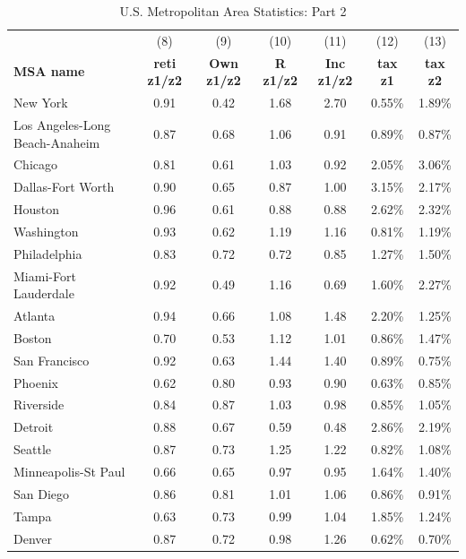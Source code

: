\documentclass[letterpaper,12pt,dvipsnames,usenames]{article}
\theoremstyle{definition}
\begin{document}
\begin{spacing}{1.0}
\begin{small}
\begin{table}
\caption{U.S. Metropolitan Area Statistics: Part 2}\label{table:msas2}
\setlength{\tabcolsep}{5pt}
\renewcommand{\arraystretch}{1.05}
\begin{center}
{\scriptsize
    \begin{tabular}{lcccccc}
    \hline &   (8) & (9) & (10) & (11) & (12) & (13) \\
        \textbf{MSA name} & \textbf{reti z1/z2} & \textbf{Own z1/z2} & \textbf{R z1/z2} & \textbf{Inc z1/z2} & \textbf{tax z1} & \textbf{tax z2}  \\     \hline
New York &    0.91  & 0.42  & 1.68  & 2.70  & 0.55\% & 1.89\%  \\
Los Angeles-Long Beach-Anaheim &0.87  & 0.68  & 1.06  & 0.91  & 0.89\% & 0.87\%  \\
Chicago&0.81  & 0.61  & 1.03  & 0.92  & 2.05\% & 3.06\%  \\
Dallas-Fort Worth & 0.90  & 0.65  & 0.87  & 1.00  & 3.15\% & 2.17\%  \\
Houston & 0.96  & 0.61  & 0.88  & 0.88  & 2.62\% & 2.32\%  \\
Washington & 0.93  & 0.62  & 1.19  & 1.16  & 0.81\% & 1.19\%  \\
Philadelphia & 0.83  & 0.72  & 0.72  & 0.85  & 1.27\% & 1.50\%  \\
Miami-Fort Lauderdale & 0.92  & 0.49  & 1.16  & 0.69  & 1.60\% & 2.27\%  \\
Atlanta & 0.94  & 0.66  & 1.08  & 1.48  & 2.20\% & 1.25\%  \\
Boston & 0.70  & 0.53  & 1.12  & 1.01  & 0.86\% & 1.47\%  \\
San Francisco & 0.92  & 0.63  & 1.44  & 1.40  & 0.89\% & 0.75\%  \\
Phoenix &  0.62  & 0.80  & 0.93  & 0.90  & 0.63\% & 0.85\%  \\
Riverside & 0.84  & 0.87  & 1.03  & 0.98  & 0.85\% & 1.05\%  \\
Detroit & 0.88  & 0.67  & 0.59  & 0.48  & 2.86\% & 2.19\%  \\
Seattle & 0.87  & 0.73  & 1.25  & 1.22  & 0.82\% & 1.08\%  \\
Minneapolis-St Paul & 0.66  & 0.65  & 0.97  & 0.95  & 1.64\% & 1.40\%  \\
San Diego & 0.86  & 0.81  & 1.01  & 1.06  & 0.86\% & 0.91\%  \\
Tampa &  0.63  & 0.73  & 0.99  & 1.04  & 1.85\% & 1.24\%  \\
Denver & 0.87  & 0.72  & 0.98  & 1.26  & 0.62\% & 0.70\%  \\

\end{tabular}}
\end{center}
\end{table}
\end{small}
\end{spacing}
\end{document}
